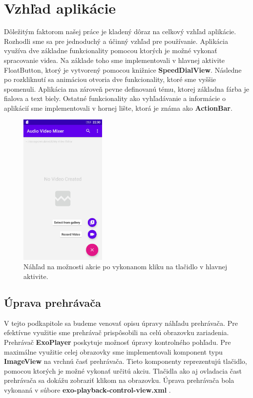 \documentclass[12pt, oneside]{book}
\begin{document}
\section{Vzhľad aplikácie}

\hspace{15pt} Dôležitým faktorom našej práce je kladený dôraz na celkový vzhľad aplikácie. Rozhodli sme sa pre jednoduchý a účinný vzhľad pre používanie. Aplikácia využíva dve základne funkcionality pomocou ktorých je možné vykonať spracovanie videa. Na základe toho sme implementovali v hlavnej aktivite FloatButton, ktorý je vytvorený pomocou knižnice \textbf{SpeedDialView}. Následne po rozkliknutí sa animáciou otvoria dve funkcionality, ktoré sme vyššie spomenuli. Aplikácia ma zároveň pevne definovanú tému, ktorej základna fárba je fialova a text biely. Ostatné funkcionality ako vyhľadávanie a informácie o aplikácií sme implementovali v hornej lište, ktorá je známa ako \textbf{ActionBar}.


\begin{figure}[H]
    \centering
    \includegraphics[width=0.38\textwidth]{images/main.jpg}
    \caption{Náhľad na možnosti akcie po vykonanom kliku na tlačidlo v hlavnej aktivite. }
    \label{fig:obr07}
\end{figure}

\subsection{Úprava prehrávača}

\hspace{15pt} V tejto podkapitole sa budeme venovať opisu úpravy náhľadu prehrávača. Pre efektívne využitie sme prehrávač prispôsobili na celú obrazovku zariadenia. Prehrávač \textbf{ExoPlayer} poskytuje možnosť úpravy kontrolného pohľadu. Pre maximálne využitie celej obrazovky sme implementovali komponent typu \textbf{ImageView} na vrchnú časť prehrávača. Tieto komponenty reprezentujú tlačidlo, pomocou ktorých je možné vykonať určitú akciu. Tlačidla ako aj ovladacia čast prehrávača sa dokážu zobraziť klikom na obrazovku. Úprava prehrávača bola vykonaná v súbore \textbf{exo-playback-control-view.xml} .
\end{document}
